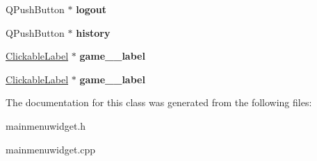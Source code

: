 \begin{DoxyCompactItemize}
Q\+Push\+Button $\ast$ {\bfseries logout}
\item 
\mbox{\label{classMainMenuWidget_a44f2dc5e221e5f2edfeac135b0a54220}} 
Q\+Push\+Button $\ast$ {\bfseries history}
\item 
\mbox{\label{classMainMenuWidget_abf23eb9532e4cbca4a15cc9a17b79b87}} 
\hyperlink{classClickableLabel}{Clickable\+Label} $\ast$ {\bfseries game\+\_\+\_\+label}
\item 
\mbox{\label{classMainMenuWidget_acb10152f41acad8f1bb3d7308e341dcb}} 
\hyperlink{classClickableLabel}{Clickable\+Label} $\ast$ {\bfseries game\+\_\+\_\+label}
\end{DoxyCompactItemize}


The documentation for this class was generated from the following files\+:\begin{DoxyCompactItemize}
\item 
mainmenuwidget.\+h\item 
mainmenuwidget.\+cpp\end{DoxyCompactItemize}
